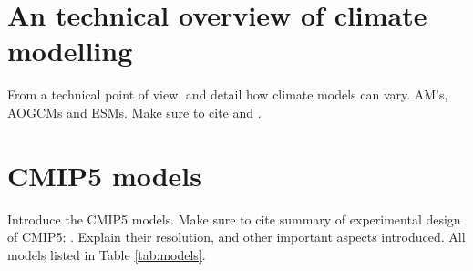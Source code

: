 \section{An technical overview of climate modelling}
\label{chap:method_techover_climmod}
From a technical point of view, and detail how climate models can vary. AM's, AOGCMs and ESMs. Make sure to cite \cite{Meehl2007} and \cite{Hibbard2007}.
\section{CMIP5 models}
\label{chap:method_CMIP5}
Introduce the CMIP5 models. Make sure to cite summary of experimental design of CMIP5: \cite{Taylor2007}. Explain their resolution, and other important aspects introduced. All models listed in Table \ref{tab:models}.
